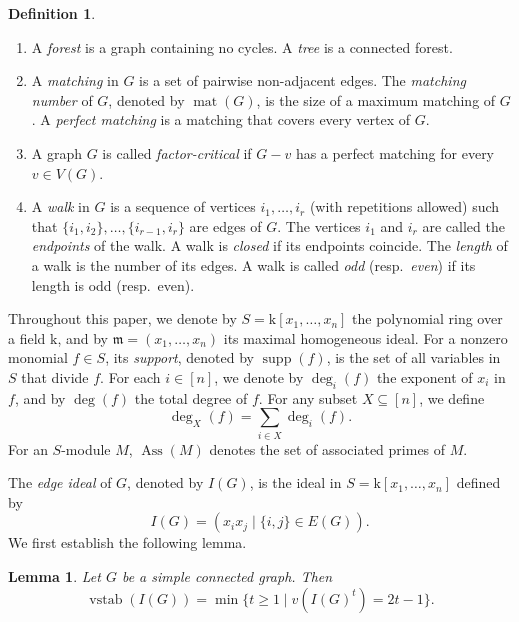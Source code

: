 \documentclass[12pt,reqno,twoside]{amsart}
\newcommand{\mm}{\mathfrak m}
\newcommand{\kk}{\mathrm k}
\newtheorem{lem}[thm]{\bf Lemma}
\theoremstyle{definition}
\newtheorem{defn}[thm]{\bf Definition}
\theoremstyle{plain}
\theoremstyle{remark}
\numberwithin{equation}{section}
\begin{document}
\begin{defn}
\begin{enumerate}
    \item A \emph{forest} is a graph containing no cycles. A \emph{tree} is a connected forest.
    
    \item A \emph{matching} in $G$ is a set of pairwise non-adjacent edges. The \emph{matching number} of $G$, denoted by $\operatorname{mat}(G)$, is the size of a maximum matching of $G$. A \emph{perfect matching} is a matching that covers every vertex of $G$.
    
    \item A graph $G$ is called \emph{factor-critical} if $G - v$ has a perfect matching for every $v \in V(G)$.
    
    \item A \emph{walk} in $G$ is a sequence of vertices $i_1, \ldots, i_r$ (with repetitions allowed) such that $\{i_1,i_2\}, \ldots, \{i_{r-1},i_r\}$ are edges of $G$. The vertices $i_1$ and $i_r$ are called the \emph{endpoints} of the walk. A walk is \emph{closed} if its endpoints coincide. The \emph{length} of a walk is the number of its edges. A walk is called \emph{odd} (resp.\ \emph{even}) if its length is odd (resp.\ even).
\end{enumerate}
\end{defn}

Throughout this paper, we denote by $S = \kk[x_1, \ldots, x_n]$ the polynomial ring over a field $\kk$, and by $\mm = (x_1, \ldots, x_n)$ its maximal homogeneous ideal. For a nonzero monomial $f \in S$, its \emph{support}, denoted by $\operatorname{supp}(f)$, is the set of all variables in $S$ that divide $f$. For each $i \in [n]$, we denote by $\deg_i(f)$ the exponent of $x_i$ in $f$, and by $\deg(f)$ the total degree of $f$. For any subset $X \subseteq [n]$, we define
\[
\deg_X(f) = \sum_{i \in X} \deg_i(f).
\]
For an $S$-module $M$, $\operatorname{Ass}(M)$ denotes the set of associated primes of $M$.

The \emph{edge ideal} of $G$, denoted by $I(G)$, is the ideal in $S = \kk[x_1, \ldots, x_n]$ defined by
\[
I(G) = (x_i x_j \mid \{i,j\} \in E(G)).
\]
We first establish the following lemma.

\begin{lem}\label{lem_index_0} 
Let $G$ be a simple connected graph. Then 
\[
\operatorname{vstab}(I(G)) = \min \{t \ge 1 \mid v(I(G)^t) = 2t-1\}.
\]
\end{lem}
\end{document}
